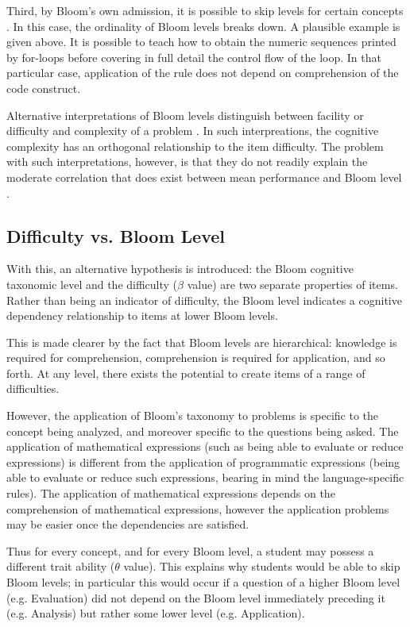 Third, by Bloom's own admission, it is possible to skip levels for certain
concepts \cite{bloom1956}.  In this case, the ordinality of Bloom levels
breaks down.  A plausible example is given above.  It is possible to teach how
to obtain the numeric sequences printed by for-loops before covering in full
detail the control flow of the loop.  In that particular case, application of
the rule does not depend on comprehension of the code construct.

Alternative interpretations of Bloom levels distinguish between facility or
difficulty and complexity of a problem \cite{hill1981testing,
thompson2008bloom}.  In such interpreations, the cognitive complexity has an
orthogonal relationship to the item difficulty.  The problem with such
interpretations, however, is that they do not readily explain the moderate
correlation that does exist between mean performance and Bloom level
\cite{hill1981testing}.

\subsection{Difficulty vs. Bloom Level}

With this, an alternative hypothesis is introduced: the Bloom cognitive
taxonomic level and the difficulty ($\beta$ value) are two separate properties
of items. Rather than being an indicator of difficulty, the Bloom level
indicates a cognitive dependency relationship to items at lower Bloom levels.

This is made clearer by the fact that Bloom levels are hierarchical: knowledge
is required for comprehension, comprehension is required for application, and
so forth.  At any level, there exists the potential to create items of a
range of difficulties. 

However, the application of Bloom's taxonomy to problems is specific to the
concept being analyzed, and moreover specific to the questions being asked.
The application of mathematical expressions (such as being able to evaluate or
reduce expressions) is different from the application of programmatic
expressions (being able to evaluate or reduce such expressions, bearing in mind
the language-specific rules).  The application of mathematical expressions
depends on the comprehension of mathematical expressions, however the
application problems may be easier once the dependencies are satisfied. 

Thus for every concept, and for every Bloom level, a student may possess a
different trait ability ($\theta$ value).  This explains why students would be
able to skip Bloom levels; in particular this would occur if a question of a
higher Bloom level (e.g. Evaluation) did not depend on the Bloom level
immediately preceding it (e.g. Analysis) but rather some lower level (e.g.
Application).  



